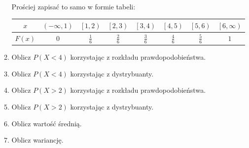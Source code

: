 \documentclass[twoside]{mwart}
\newcommand{\ans}[1]{}
\newenvironment{ansenv}{\comment}{\endcomment}
\newenvironment{ansenv}{\paragraph{Odpowiedź:}}{}
\newcommand{\ans}[1]{\begin{ansenv}#1\end{ansenv}}
\begin{document}
\begin{enumerate}
\begin{enumerate}
{	Prościej zapisać to samo w formie tabeli:\\
	\begin{tabular}{c|ccccccc}
		$x$ & $\left(-\infty, 1\right)$ & $\left[1, 2\right)$ & $\left[2, 3\right)$ & $\left[3, 4\right)$ & $\left[4, 5\right)$ & $\left[5, 6\right)$ & $\left[6, \infty\right)$ \\
		\hline
		$F(x)$ & $0$ & $\frac{1}{6}$ & $\frac{2}{6}$ & $\frac{3}{6}$ & $\frac{4}{6}$ & $\frac{5}{6}$ & $1$ \\
	\end{tabular}
}
\item Oblicz $P(X<4)$ korzystając z rozkładu prawdopodobieństwa. \ans{\[P(X<4)=P(X=1)+P(X=2)+P(X=3)=\frac{1}{6}+\frac{1}{6}+\frac{1}{6}=\frac{3}{6}\]}
\item Oblicz $P(X<4)$ korzystając z dystrybuanty. 
\ans{\[P(X<4)=\lim_{x\to 4-} F(x) = F(3) = \frac{1}{2}\]
	Przejście od $x\to 4-$ do $3$ wynika z tego, że de facto interesuje nas dowolna liczba z przedziału kończącego się w 4 otwartym, tj. przedziału $\left[3,4\right)$, a zatem np. $3$.
}
\item Oblicz $P(X>2)$ korzystając z rozkładu prawdopodobieństwa. \ans{\[P(X>2)=P(X=3)+P(X=4)+P(X=5)+P(X=6)=\frac{1}{6}+\frac{1}{6}+\frac{1}{6}+\frac{1}{6}=\frac{4}{6}\]}
\item Oblicz $P(X>2)$ korzystając z dystrybuanty. \ans{\[P(X>2)=1-P(X\leq 2)=1-F(2)=1-\frac{2}{6}=\frac{2}{3}\]}
\item Oblicz wartość średnią. \ans{
	\[EX=\sum_{x_i} x_i\cdot P(X=x_i) = 1\cdot\frac{1}{6} +2\cdot\frac{1}{6} +3\cdot\frac{1}{6} +4\cdot\frac{1}{6} +5\cdot\frac{1}{6} +6\cdot\frac{1}{6} +  \frac{21}{6}=3{,}5\]
}
\item Oblicz wariancję.
\ans{
	Dwa sposoby:
	\begin{enumerate}
		\item Bezpośrednio z definicji
		\begin{align*}
		 D^2X = & E\left[(X-EX)^2\right] = \sum_{x_i} \left(x_i-EX)^2\cdot P(X=x_i)\right) = \\ & (1 - 3{,}5)^2\cdot\frac{1}{6} (2 - 3{,}5)^2\cdot\frac{1}{6} (3 - 3{,}5)^2\cdot\frac{1}{6} (4 - 3{,}5)^2\cdot\frac{1}{6} (5 - 3{,}5)^2\cdot\frac{1}{6} (6 - 3{,}5)^2\cdot\frac{1}{6} = \\ &		 
		\frac{1}{6}((-2{,}5)^2+(-1{,}5)^2+(-0{,}5)^2+2{,}5^2+1{,}5^2+0{,}5^2)
		= 2\frac{11}{12}
		\end{align*}
		\item Posługując się przekształconym wzorem:
		\begin{align*}

\end{align*}
\end{enumerate}}
\end{enumerate}
\end{enumerate}
\end{document}
